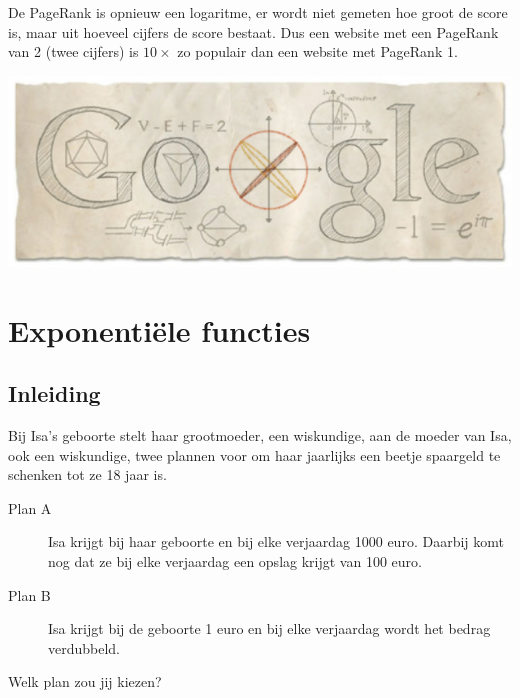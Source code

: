 \documentclass[12pt,twoside,a4paper]{article}
\begin{document}
\begin{minipage}{0.45\textwidth}
De PageRank is opnieuw een logaritme, er wordt niet gemeten hoe groot de score is, maar uit hoeveel cijfers de score bestaat. Dus een website met een PageRank van 2 (twee cijfers) is $10\times$ zo populair dan een website met PageRank 1.
\end{minipage}
\begin{minipage}{0.55\textwidth}
\includegraphics[width=\textwidth]{pagerank}
\end{minipage}

\cleardoublepage
\section{Exponentiële functies}

\subsection{Inleiding}

Bij Isa's geboorte stelt haar grootmoeder, een wiskundige, aan de moeder van Isa, ook een wiskundige, twee plannen voor om haar jaarlijks een beetje spaargeld te schenken tot ze 18 jaar is.

\begin{description}
  \item[Plan A] Isa krijgt bij haar geboorte en bij elke verjaardag 1000 euro. Daarbij komt nog dat ze bij elke verjaardag een opslag krijgt van 100 euro.
  \item[Plan B] Isa krijgt bij de geboorte 1 euro en bij elke verjaardag wordt het bedrag verdubbeld.
\end{description}

Welk plan zou jij kiezen?
\end{document}
